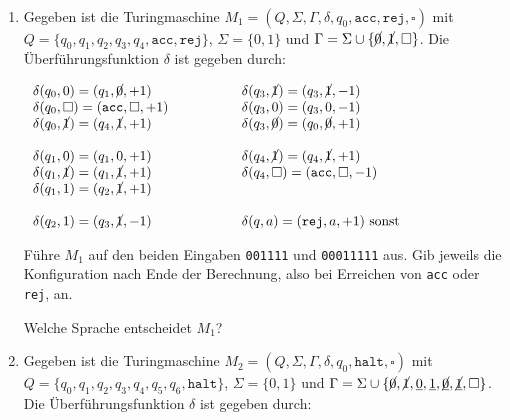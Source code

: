 \documentclass{uebung_cs}
\begin{document}
\begin{exercise}[Turingmaschinen I]\
	\begin{enumerate}
		\item Gegeben ist die Turingmaschine $M_1 = (Q,\Sigma,\Gamma,\delta,q_0,\texttt{acc},\mathtt{rej},\square)$ mit\\
		$Q = \{q_0,q_1,q_2,q_3,q_4,\mathtt{acc},\mathtt{rej}\}$, $\Sigma = \{0,1\}$ und $\Gamma = \Sigma \cup \{\cancel{0},\cancel{1},\square\}$. Die Überführungsfunktion $\delta$ ist gegeben durch:
		
		\[\begin{tabular}{p{5cm}p{7.2cm}}
			$\delta(q_0,0) = (q_1,\cancel{0},+1)$ & $\delta(q_3,\cancel{1}) = (q_3,\cancel{1},-1)$\\
			$\delta(q_0,\square) = (\mathtt{acc},\square ,+1)$ &  $\delta(q_3,0) = (q_3,0,-1)$\\
			$\delta(q_0,\cancel{1}) = (q_4,\cancel{1},+1)$ & $\delta(q_3,\cancel{0}) = (q_0,\cancel{0},+1)$\\
			& \\
			$\delta(q_1,0) = (q_1,0,+1)$ & $\delta(q_4,\cancel{1}) = (q_4,\cancel{1},+1)$\\
			$\delta(q_1,\cancel{1}) = (q_1,\cancel{1},+1)$ &  $\delta(q_4,\square) = (\mathtt{acc},\square ,-1)$\\
			$\delta(q_1,1) = (q_2,\cancel{1},+1)$ & \\
			& \\
			$\delta(q_2,1) = (q_3,\cancel{1},-1)$ & $\delta(q,a) = (\mathtt{rej},a,+1)$ sonst\\
		\end{tabular}\]
		
		Führe $M_1$ auf den beiden Eingaben \texttt{001111} und \texttt{00011111} aus. Gib jeweils die Konfiguration nach Ende der Berechnung, also bei Erreichen von \texttt{acc} oder \texttt{rej}, an.
		
		Welche Sprache entscheidet $M_1$?
		
		\item Gegeben ist die Turingmaschine $M_2 = (Q,\Sigma,\Gamma,\delta,q_0,\mathtt{halt},\square)$ mit\\
		$Q = \{q_0,q_1,q_2,q_3,q_4,q_5,q_6,\mathtt{halt}\}$, $\Sigma = \{0,1\}$ und $\Gamma = \Sigma \cup \{\cancel{0},\cancel{1},\underline{0},\underline{1},\underline{\cancel{0}},\underline{\cancel{1}},\square\}$.
    Die Überführungsfunktion $δ$ ist gegeben durch:
		

\end{enumerate}
\end{exercise}
\end{document}
